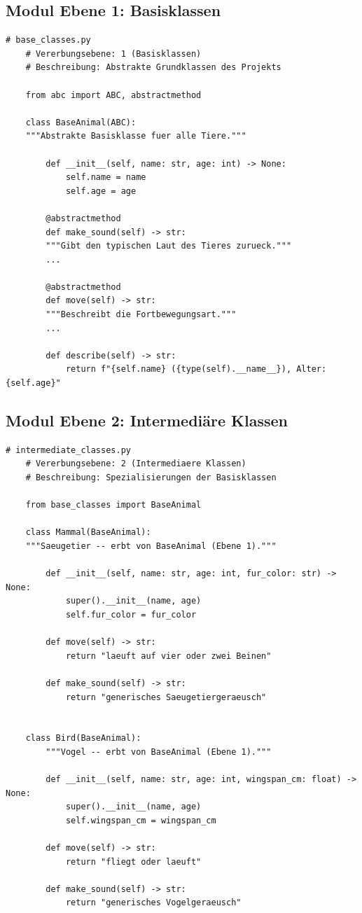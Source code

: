 ﻿\documentclass[a4paper,12pt]{article}
\begin{document}
\subsection{Modul Ebene 1: Basisklassen}

\begin{lstlisting}[caption={base\_classes.py -- Ebene 1 der Vererbungshierarchie},
	label={lst:base}]
	# base_classes.py
	# Vererbungsebene: 1 (Basisklassen)
	# Beschreibung: Abstrakte Grundklassen des Projekts
	
	from abc import ABC, abstractmethod
	
	class BaseAnimal(ABC):
	"""Abstrakte Basisklasse fuer alle Tiere."""
	
		def __init__(self, name: str, age: int) -> None:
			self.name = name
			self.age = age
	
		@abstractmethod
		def make_sound(self) -> str:
		"""Gibt den typischen Laut des Tieres zurueck."""
		...
	
		@abstractmethod
		def move(self) -> str:
		"""Beschreibt die Fortbewegungsart."""
		...
	
		def describe(self) -> str:
			return f"{self.name} ({type(self).__name__}), Alter: {self.age}"
\end{lstlisting}

\subsection{Modul Ebene 2: Intermediäre Klassen}

\begin{lstlisting}[caption={intermediate\_classes.py -- Ebene 2 der Vererbungshierarchie},
	label={lst:intermediate}]
	# intermediate_classes.py
	# Vererbungsebene: 2 (Intermediaere Klassen)
	# Beschreibung: Spezialisierungen der Basisklassen
	
	from base_classes import BaseAnimal
	
	class Mammal(BaseAnimal):
	"""Saeugetier -- erbt von BaseAnimal (Ebene 1)."""
	
		def __init__(self, name: str, age: int, fur_color: str) -> None:
			super().__init__(name, age)
			self.fur_color = fur_color
		
		def move(self) -> str:
			return "laeuft auf vier oder zwei Beinen"
		
		def make_sound(self) -> str:
			return "generisches Saeugetiergeraeusch"
		
		
	class Bird(BaseAnimal):
		"""Vogel -- erbt von BaseAnimal (Ebene 1)."""
		
		def __init__(self, name: str, age: int, wingspan_cm: float) -> None:
			super().__init__(name, age)
			self.wingspan_cm = wingspan_cm
		
		def move(self) -> str:
			return "fliegt oder laeuft"
		
		def make_sound(self) -> str:
			return "generisches Vogelgeraeusch"
\end{lstlisting}
\end{document}
